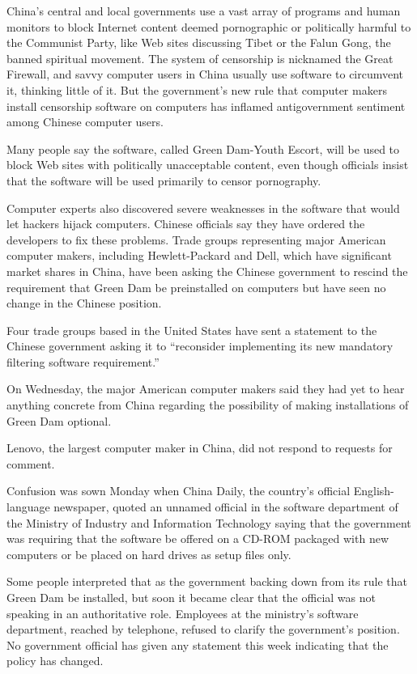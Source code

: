 ﻿\documentclass[12pt,a4paper,onecolumn]{article}
\begin{document}
China's central and local governments use a vast array of programs and human monitors to block
Internet content deemed pornographic or politically harmful to the Communist Party, like Web sites
discussing Tibet or the Falun Gong, the banned spiritual movement. The system of censorship is
nicknamed the Great Firewall, and savvy computer users in China usually use software to circumvent
it, thinking little of it. But the government's new rule that computer makers install censorship
software on computers has inflamed antigovernment sentiment among Chinese computer users.

Many people say the software, called Green Dam-Youth Escort, will be used to block Web sites with
politically unacceptable content, even though officials insist that the software will be used
primarily to censor pornography.

Computer experts also discovered severe weaknesses in the software that would let hackers hijack
computers. Chinese officials say they have ordered the developers to fix these problems. Trade
groups representing major American computer makers, including Hewlett-Packard and Dell, which have
significant market shares in China, have been asking the Chinese government to rescind the
requirement that Green Dam be preinstalled on computers but have seen no change in the Chinese
position.

Four trade groups based in the United States have sent a statement to the Chinese government asking
it to ``reconsider implementing its new mandatory filtering software requirement.''

On Wednesday, the major American computer makers said they had yet to hear anything concrete from
China regarding the possibility of making installations of Green Dam optional.

Lenovo, the largest computer maker in China, did not respond to requests for comment.

Confusion was sown Monday when China Daily, the country's official English-language newspaper,
quoted an unnamed official in the software department of the Ministry of Industry and Information
Technology saying that the government was requiring that the software be offered on a CD-ROM
packaged with new computers or be placed on hard drives as setup files only.

Some people interpreted that as the government backing down from its rule that Green Dam be
installed, but soon it became clear that the official was not speaking in an authoritative role.
Employees at the ministry's software department, reached by telephone, refused to clarify the
government's position. No government official has given any statement this week indicating that the policy has changed.
\end{document}
